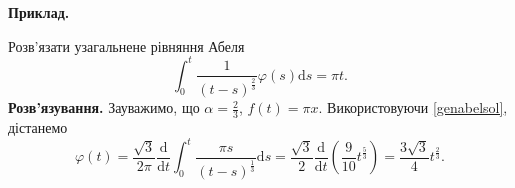\documentclass[14pt,twoside]{extreport}
\theoremstyle{mystyle}
\numberwithin{equation}{chapter}
\begin{document}
\begin{small}
	\textbf{Приклад.}
	
	Розв'язати узагальнене рівняння Абеля
	\begin{equation*}
	\displaystyle \int_{0}^{t}\frac{1}{(t-s)^{\frac{2}{3}}}\varphi(s)\mathrm{d}s = \pi t.
	\end{equation*}
	\textbf{Розв'язування.}
	Зауважимо, що $\displaystyle \alpha=\frac{2}{3}$, $f(t)=\pi x$. Використовуючи \eqref{genabelsol}, дістанемо
	\begin{equation*}
	\varphi(t)=\displaystyle \frac{\sqrt{3}}{2\pi}\frac{\mathrm{d}}{\mathrm{d}t}\int_{0}^{t}\frac{\pi s}{(t-s)^{\frac{1}{3}}}\mathrm{d}s=\frac{\sqrt{3}}{2}\frac{\mathrm{d}}{\mathrm{d}t}\left(\frac{9}{10}t^{\frac{5}{3}}\right)=\frac{3\sqrt{3}}{4}t^{\frac{2}{3}}.
	\end{equation*}
\end{small}
\end{document}

